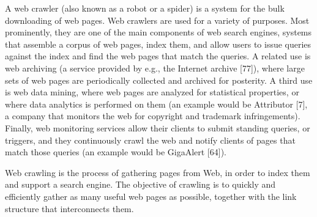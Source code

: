 A web crawler (also known as a robot or a spider) is a system for the
bulk downloading of web pages. Web crawlers are used for a variety of
purposes. Most prominently, they are one of the main components of
web search engines, systems that assemble a corpus of web pages, index
them, and allow users to issue queries against the index and find the web
pages that match the queries. A related use is web archiving (a service
provided by e.g., the Internet archive [77]), where large sets of web pages
are periodically collected and archived for posterity. A third use is web
data mining, where web pages are analyzed for statistical properties,
or where data analytics is performed on them (an example would be
Attributor [7], a company that monitors the web for copyright and
trademark infringements). Finally, web monitoring services allow their
clients to submit standing queries, or triggers, and they continuously
crawl the web and notify clients of pages that match those queries (an
example would be GigaAlert [64]).

Web crawling is the process of gathering pages from Web, in
order to index them and support a search engine. The objective of crawling
is to quickly and efficiently gather as many useful web pages as possible,
together with the link structure that interconnects them.

